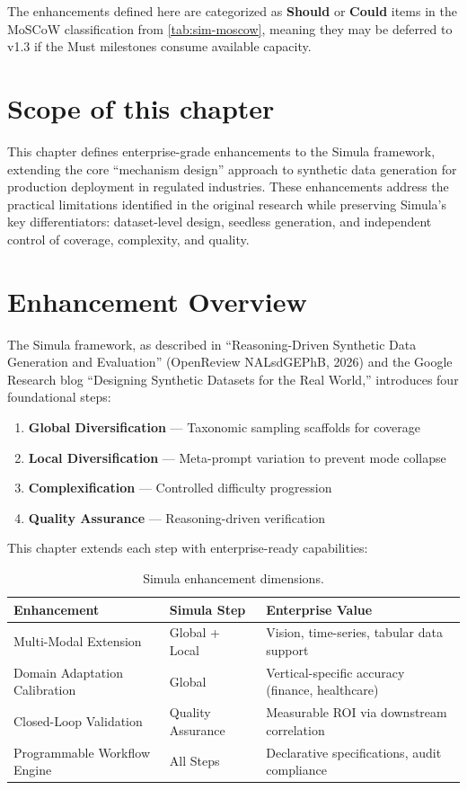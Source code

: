\noindent
The enhancements defined here are categorized as \textbf{Should} or \textbf{Could} 
items in the MoSCoW classification from \cref{tab:sim-moscow}, meaning they may 
be deferred to v1.3 if the Must milestones consume available capacity.

\section*{Scope of this chapter}

This chapter defines enterprise-grade enhancements to the Simula framework, extending
the core ``mechanism design'' approach to synthetic data generation for production
deployment in regulated industries. These enhancements address the practical limitations
identified in the original research while preserving Simula's key differentiators:
dataset-level design, seedless generation, and independent control of coverage,
complexity, and quality.

\section{Enhancement Overview}

The Simula framework, as described in ``Reasoning-Driven Synthetic Data Generation
and Evaluation'' (OpenReview NALsdGEPhB, 2026) and the Google Research blog
``Designing Synthetic Datasets for the Real World,'' introduces four foundational
steps:

\begin{enumerate}
  \item \textbf{Global Diversification} --- Taxonomic sampling scaffolds for coverage
  \item \textbf{Local Diversification} --- Meta-prompt variation to prevent mode collapse
  \item \textbf{Complexification} --- Controlled difficulty progression
  \item \textbf{Quality Assurance} --- Reasoning-driven verification
\end{enumerate}

This chapter extends each step with enterprise-ready capabilities:

\begin{table}[htbp]
\centering
\caption{Simula enhancement dimensions.}
\label{tab:enhancement-dimensions}
\footnotesize
\begin{tabularx}{\textwidth}{@{}l l X@{}}
\toprule
\textbf{Enhancement} & \textbf{Simula Step} & \textbf{Enterprise Value} \\
\midrule
Multi-Modal Extension & Global + Local & Vision, time-series, tabular data support \\
Domain Adaptation Calibration & Global & Vertical-specific accuracy (finance, healthcare) \\
Closed-Loop Validation & Quality Assurance & Measurable ROI via downstream correlation \\
Programmable Workflow Engine & All Steps & Declarative specifications, audit compliance \\
\bottomrule
\end{tabularx}
\end{table}


